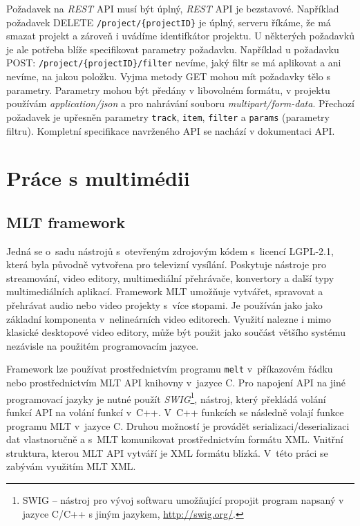 Požadavek na \textit{REST} API musí být úplný, \textit{REST} API je bezstavové. Například požadavek DELETE \texttt{/project/\{projectID\}} je úplný, serveru říkáme, že má smazat projekt a zároveň i uvádíme identifkátor projektu. U některých požadavků je ale potřeba blíže specifikovat parametry požadavku. Například u požadavku POST: \texttt{/project/\{projectID\}/filter} nevíme, jaký filtr se má aplikovat a ani nevíme, na jakou položku. Vyjma metody GET mohou mít požadavky tělo s parametry. Parametry mohou být předány v libovolném formátu, v projektu používám \textit{application/json} a pro nahrávání souboru \textit{multipart/form-data}. Přechozí požadavek je upřesněn parametry \texttt{track}, \texttt{item}, \texttt{filter} a \texttt{params} (parametry filtru). Kompletní specifikace navrženého API se nachází v dokumentaci API.

\chapter{Práce s multimédii}
\section{MLT framework}
Jedná se o~sadu nástrojů s~otevřeným zdrojovým kódem s~licencí LGPL-2.1, která byla původně vytvořena pro televizní vysílání. Poskytuje nástroje pro streamování, video editory, multimediální přehrávače, konvertory a další typy multimediálních aplikací. Framework MLT umožňuje vytvářet, spravovat a přehrávat audio nebo video projekty s~více stopami. Je používán jako jako základní komponenta v~nelineárních video editorech. Využití nalezne i mimo klasické desktopové video editory, může být použit jako součást většího systému nezávisle na použitém programovacím jazyce.

Framework lze používat prostřednictvím programu \texttt{melt} v~příkazovém řádku nebo prostřednictvím MLT API knihovny v~jazyce C. Pro napojení API na jiné programovací jazyky je nutné použít \textit{SWIG}\footnote{SWIG -- nástroj pro vývoj softwaru umožňující propojit program napsaný v jazyce C/C++ s jiným jazykem, \url{http://swig.org/}.}, nástroj, který překládá volání funkcí API na volání funkcí v~C++. V~C++ funkcích se následně volají funkce programu MLT v~jazyce C. Druhou možností je provádět serializaci/deserializaci dat vlastnoručně a s~MLT komunikovat prostřednictvím formátu XML. Vnitřní struktura, kterou MLT API vytváří je XML formátu blízká. V~této práci se zabývám využitím MLT XML.


